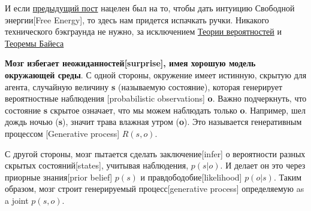 \documentclass[twoside,leqno, 11pt]{article}
\begin{document}
	И если \href{https://medium.com/@solopchuk/intuitions-on-predictive-coding-and-the-free-energy-principle-3fc5bcedc754}{предыдущий пост} нацелен был на то, чтобы дать интуицию Свободной энергии[Free Energy], то здесь нам придется испачкать ручки. Никакого технического бэкграунда не нужно, за исключением \href{https://www.mathsisfun.com/data/probability.html}{Теории вероятностей} и \href{https://www.mathsisfun.com/data/bayes-theorem.html}{Теоремы Байеса}

	\textbf{Мозг избегает неожиданностей[surprise], имея хорошую модель окружающей среды}. С одной стороны, окружение имеет истинную, скрытую для агента, случайную величину \textbf{s} (называемую состояние), которая генерирует вероятностные наблюдения [probabilistic observations] \textbf{o}. Важно подчеркнуть, что состояние \textbf{s} скрытое означает, что мы можем наблюдать только \textbf{o}. Например, шел дождь ночью (\textbf{s}), значит трава влажная утром (\textbf{o}). Это называется генеративным процессом [Generative process] $R(s,o)$.
	
	\begin{figure}[h]
		\label{ris:image}
	\end{figure}
	
	С другой стороны, мозг пытается сделать заключение[infer] о вероятности разных скрытых состояний[states], учитывая наблюдения, $p(s|o)$. И делает он это через приорные знания[prior belief] $p(s)$ и правдободобие[likelihood] $p(o|s)$. Таким образом, мозг строит генерируемый процесс[generative process] определяемую as a joint $p(s,o)$.

	\begin{figure}[h]
		\label{ris:image}
	\end{figure}
	
\end{document}
